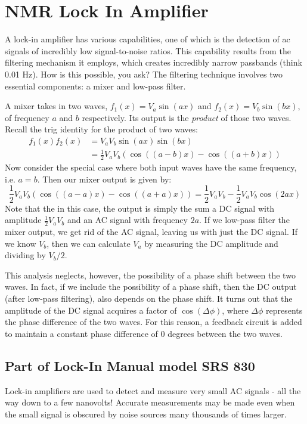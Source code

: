 \documentclass{../lab}
\begin{document}
\section{NMR Lock In Amplifier}

A lock-in amplifier has various capabilities, one of which is the detection of ac signals of incredibly low signal-to-noise ratios. This capability results from the filtering mechanism it employs, which creates incredibly narrow passbands (think 0.01 Hz). How is this possible, you ask? The filtering technique involves two essential components: a mixer and low-pass filter.

A mixer takes in two waves, $f_1(x) = V_a\sin(ax)$ and $f_2(x) = V_b\sin(bx)$, of frequency $a$ and $b$ respectively. Its output is the \emph{product} of those two waves. Recall the trig identity for the product of two waves:
\begin{align*}
f_1(x) f_2(x) &= V_a V_b \sin(ax)\sin(bx) \\
&= \frac{1}{2} V_a V_b(\cos((a-b)x) - \cos((a+b)x))
\end{align*}
Now consider the special case where both input waves have the same frequency, i.e. $a = b$. Then our mixer output is given by:
\[
\frac{1}{2} V_a V_b(\cos((a-a)x) - \cos((a+a)x))
    = \frac{1}{2}V_a V_b - \frac{1}{2} V_a V_b \cos(2ax)
\]
Note that the in this case, the output is simply the sum a DC signal with amplitude $\frac{1}{2} V_a V_b$ and an AC signal with frequency $2a$. If we low-pass filter the mixer output, we get rid of the AC signal, leaving us with just the DC signal. If we know $V_b$, then we can calculate $V_a$ by measuring the DC amplitude and dividing by $V_b/2$.

This analysis neglects, however, the possibility of a phase shift between the two waves. In fact, if we include the possibility of a phase shift, then the DC output (after low-pass filtering), also depends on the phase shift. It turns out that the amplitude of the DC signal acquires a factor of $\cos(\Delta \phi)$, where $\Delta \phi$ represents the phase difference of the two waves. For this reason, a feedback circuit is added to maintain a constant phase difference of 0 degrees between the two waves.

\subsection{Part of Lock-In Manual model SRS 830}

Lock-in amplifiers are used to detect and measure very small AC signals - all the way down to a few nanovolts! Accurate measurements may be made even when the small signal is obscured by noise sources many thousands of times larger.
\end{document}
